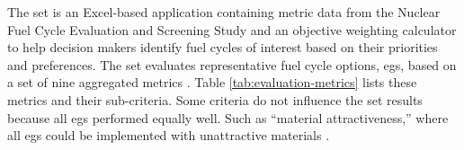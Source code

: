The \ac{set} is an Excel-based application containing metric data from the Nuclear Fuel Cycle Evaluation and Screening Study
\cite{wigeland_nuclear_2014} and an objective weighting calculator to help decision makers identify fuel cycles of interest based on their priorities and preferences. 
The \ac{set} evaluates representative fuel cycle options, \acp{eg}, based on a set of nine aggregated metrics \cite{wigeland_nuclear_2014}. Table \ref{tab:evaluation-metrics} lists these metrics
and their sub-criteria. Some criteria do not influence the \ac{set} results because all \acp{eg} performed equally well. Such as ``material attractiveness,'' where all \acp{eg}
could be implemented with unattractive materials \cite{wigeland_nuclear_2014-1}.



